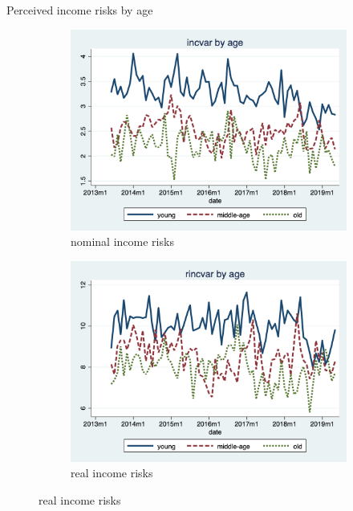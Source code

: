 \documentclass{beamer}
\begin{document}
\begin{frame}{Perceived income risks by age}
	\begin{figure}[ht]
		\label{ts_incvar_age_g_mean}
		\begin{subfigure}[b]{0.7\textwidth}
			\centering
			\caption{nominal income risks}
			\includegraphics[width=\textwidth, height = 0.33\textheight]{figures/ts_incvar_age_g_mean.png}
		\end{subfigure}
		\begin{subfigure}[b]{0.7\textwidth}
			\caption{real income risks}
			\includegraphics[width=\textwidth, height = 0.33\textheight]{figures/ts_rincvar_age_g_mean.png}
		\end{subfigure}
	\end{figure}
\end{frame}
\end{document}
